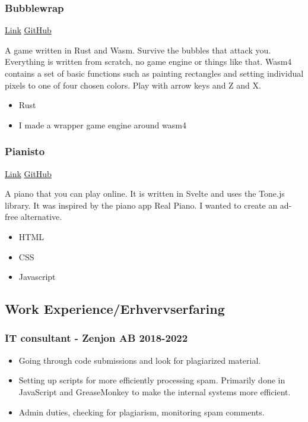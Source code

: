 \documentclass[
]{article}
\providecommand{\tightlist}{%
  \setlength{\itemsep}{0pt}\setlength{\parskip}{0pt}}
\begin{document}
\hypertarget{bubblewrap}{%
\subsubsection{Bubblewrap}\label{bubblewrap}}

\href{https://yesseri.github.io/bubblewrap.html}{Link} \textbar{}
\href{https://github.com/YesSeri/bubble-wrap}{GitHub}

A game written in Rust and Wasm. Survive the bubbles that attack you.
Everything is written from scratch, no game engine or things like that.
Wasm4 contains a set of basic functions such as painting rectangles and
setting individual pixels to one of four chosen colors. Play with arrow
keys and Z and X.

\begin{itemize}
\tightlist
\item
  Rust
\item
  I made a wrapper game engine around wasm4
\end{itemize}

\hypertarget{pianisto}{%
\subsubsection{Pianisto}\label{pianisto}}

\href{https://pianisto.net/}{Link} \textbar{}
\href{https://github.com/YesSeri/svelte-piano}{GitHub}

A piano that you can play online. It is written in Svelte and uses the
Tone.js library. It was inspired by the piano app Real Piano. I wanted
to create an ad-free alternative.

\begin{itemize}
\tightlist
\item
  HTML
\item
  CSS
\item
  Javascript
\end{itemize}

\hypertarget{work-experienceerhvervserfaring}{%
\subsection{Work
Experience/Erhvervserfaring}\label{work-experienceerhvervserfaring}}

\hypertarget{it-consultant---zenjon-ab-2018-2022}{%
\subsubsection{IT consultant - Zenjon AB
2018-2022}\label{it-consultant---zenjon-ab-2018-2022}}

\begin{itemize}
\tightlist
\item
  Going through code submissions and look for plagiarized material.
\item
  Setting up scripts for more efficiently processing spam. Primarily
  done in JavaScript and GreaseMonkey to make the internal systems more
  efficient.
\item
  Admin duties, checking for plagiarism, monitoring spam comments.
\end{itemize}
\end{document}
